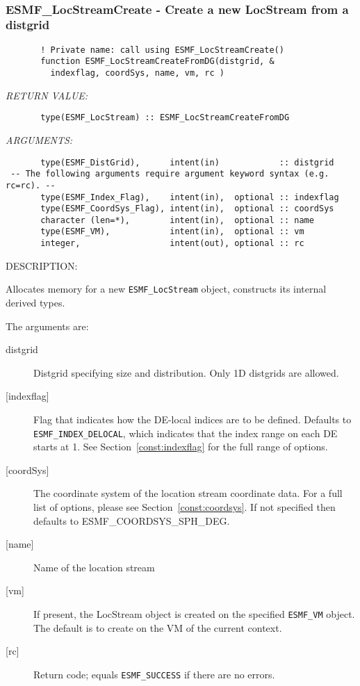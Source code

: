  
\mbox{}\hrulefill\ 
 
\subsubsection [ESMF\_LocStreamCreate] {ESMF\_LocStreamCreate - Create a new LocStream from a distgrid}


 
\begin{verbatim}       ! Private name: call using ESMF_LocStreamCreate()
       function ESMF_LocStreamCreateFromDG(distgrid, &
         indexflag, coordSys, name, vm, rc )\end{verbatim}{\em RETURN VALUE:}
\begin{verbatim}       type(ESMF_LocStream) :: ESMF_LocStreamCreateFromDG
 \end{verbatim}{\em ARGUMENTS:}
\begin{verbatim}       type(ESMF_DistGrid),      intent(in)            :: distgrid
 -- The following arguments require argument keyword syntax (e.g. rc=rc). --
       type(ESMF_Index_Flag),    intent(in),  optional :: indexflag    
       type(ESMF_CoordSys_Flag), intent(in),  optional :: coordSys
       character (len=*),        intent(in),  optional :: name
       type(ESMF_VM),            intent(in),  optional :: vm
       integer,                  intent(out), optional :: rc\end{verbatim}
{\sf DESCRIPTION:\\ }


       Allocates memory for a new {\tt ESMF\_LocStream} object, constructs its
       internal derived types. 
  
       The arguments are:
       \begin{description}
       \item[distgrid]
            Distgrid specifying size and distribution. Only 1D distgrids are allowed.
       \item[{[indexflag]}]
            Flag that indicates how the DE-local indices are to be defined.
            Defaults to {\tt ESMF\_INDEX\_DELOCAL}, which indicates
            that the index range on each DE starts at 1. See Section~\ref{const:indexflag}
            for the full range of options. 
       \item[{[coordSys]}]
           The coordinate system of the location stream coordinate data.
           For a full list of options, please see Section~\ref{const:coordsys}.
           If not specified then defaults to ESMF\_COORDSYS\_SPH\_DEG.
       \item[{[name]}]
            Name of the location stream
       \item[{[vm]}]
           If present, the LocStream object is created on the specified 
           {\tt ESMF\_VM} object. The default is to create on the VM of the 
           current context.
       \item[{[rc]}]
            Return code; equals {\tt ESMF\_SUCCESS} if there are no errors.
     \end{description}
   
